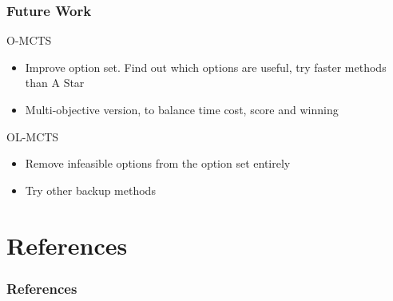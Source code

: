 \documentclass{beamer}
\begin{document}
\begin{frame}
	\frametitle{Future Work}
	\begin{block}{O-MCTS}
		\begin{itemize}
			\item Improve option set. Find out which options are useful, try
				faster methods than A Star
			\item Multi-objective version, to balance time cost, score and
				winning
		\end{itemize}
	\end{block}
	\begin{block}{OL-MCTS}
		\begin{itemize}
			\item Remove infeasible options from the option set entirely
			\item Try other backup methods
		\end{itemize}
	\end{block}
\end{frame}

\section{References}
\begin{frame}%
	\frametitle{References}
	\tiny{ }
	
\end{frame}
\end{document}
